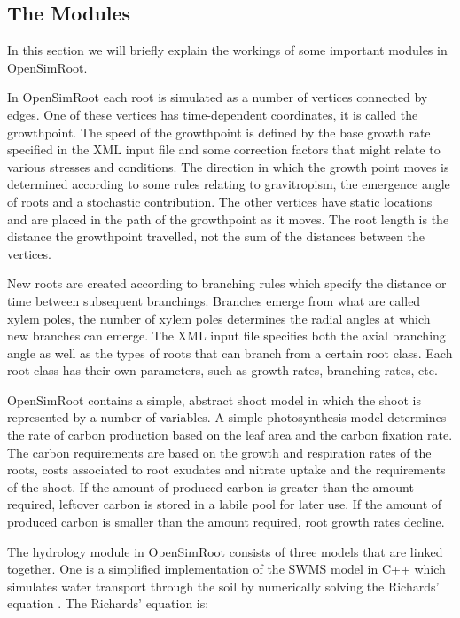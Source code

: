 \documentclass{article}
\begin{document}
\subsection{The Modules}

In this section we will briefly explain the workings of some important modules in OpenSimRoot. \newline

\noindent In OpenSimRoot each root is simulated as a number of vertices connected by edges. One of these vertices has time-dependent coordinates, it is called the growthpoint. The speed of the growthpoint is defined by the base growth rate specified in the XML input file and some correction factors that might relate to various stresses and conditions. The direction in which the growth point moves is determined according to some rules relating to gravitropism, the emergence angle of roots and a stochastic contribution. The other vertices have static locations and are placed in the path of the growthpoint as it moves. The root length is the distance the growthpoint travelled, not the sum of the distances between the vertices. \newline

\noindent New roots are created according to branching rules which specify the distance or time between subsequent branchings. Branches emerge from what are called xylem poles, the number of xylem poles determines the radial angles at which new branches can emerge. The XML input file specifies both the axial branching angle as well as the types of roots that can branch from a certain root class. Each root class has their own parameters, such as growth rates, branching rates, etc. \newline

\noindent OpenSimRoot contains a simple, abstract shoot model in which the shoot is represented by a number of variables. A simple photosynthesis model determines the rate of carbon production based on the leaf area and the carbon fixation rate. The carbon requirements are based on the growth and respiration rates of the roots, costs associated to root exudates and nitrate uptake and the requirements of the shoot. If the amount of produced carbon is greater than the amount required, leftover carbon is stored in a labile pool for later use. If the amount of produced carbon is smaller than the amount required, root growth rates decline. \newline

\noindent The hydrology module in OpenSimRoot consists of three models that are linked together. One is a simplified implementation of the SWMS model in C++ which simulates water transport through the soil by numerically solving the Richards' equation \cite{Simunek1995}. The Richards' equation is:
\end{document}
